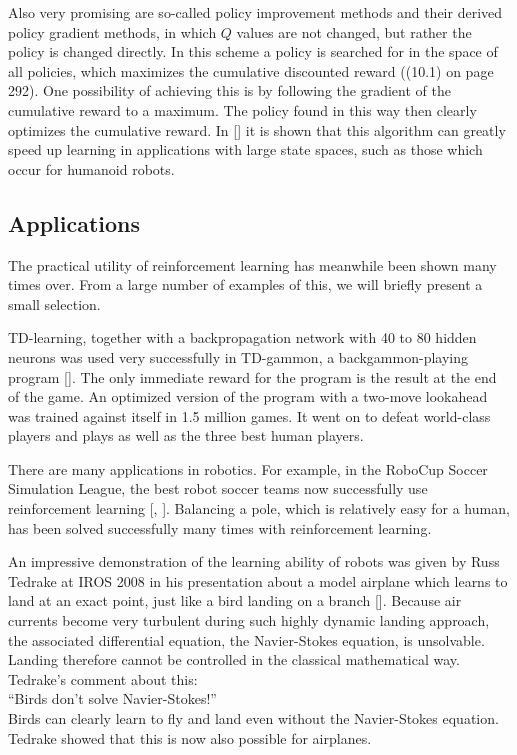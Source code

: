 \documentclass[10pt]{book}
\begin{document}
Also very promising are so-called policy improvement methods and their derived policy gradient methods, in which $Q$ values are not changed, but rather the policy is changed directly. In this scheme a policy is searched for in the space of all policies, which maximizes the cumulative discounted reward ((10.1) on page 292). One possibility of achieving this is by following the gradient of the cumulative reward to a maximum. The policy found in this way then clearly optimizes the cumulative reward. In [\cite{peters2008policygradients}] it is shown that this algorithm can greatly speed up learning in applications with large state spaces, such as those which occur for humanoid robots.

\subsection{Applications}
The practical utility of reinforcement learning has meanwhile been shown many times over. From a large number of examples of this, we will briefly present a small selection.

TD-learning, together with a backpropagation network with 40 to 80 hidden neurons was used very successfully in TD-gammon, a backgammon-playing program [\cite{tesauro1995tdgammon}]. The only immediate reward for the program is the result at the end of the game. An optimized version of the program with a two-move lookahead was trained against itself in 1.5 million games. It went on to defeat world-class players and plays as well as the three best human players.

There are many applications in robotics. For example, in the RoboCup Soccer Simulation League, the best robot soccer teams now successfully use reinforcement learning [\cite{stone2005keepaway}, \cite{roboserver}]. Balancing a pole, which is relatively easy for a human, has been solved successfully many times with reinforcement learning.

An impressive demonstration of the learning ability of robots was given by Russ Tedrake at IROS 2008 in his presentation about a model airplane which learns to land at an exact point, just like a bird landing on a branch [\cite{tedrake2008intermediate}]. Because air currents become very turbulent during such highly dynamic landing approach, the associated differential equation, the Navier-Stokes equation, is unsolvable. Landing therefore cannot be controlled in the classical mathematical way. Tedrake's comment about this:\\
``Birds don't solve Navier-Stokes!''\\
Birds can clearly learn to fly and land even without the Navier-Stokes equation. Tedrake showed that this is now also possible for airplanes.
\end{document}
